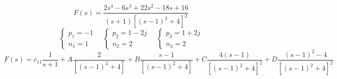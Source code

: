 	\begin{mdframed}[style=Exercise]
		\begin{Exercise}[title={Poli reali semplici, poli complessi multipli}, difficulty=3]
			\[
				F(s) = \frac{2s^4-6s^3+22s^2-18s+16}{(s+1)[(s-1)^2+4]^2}
			\]
			\[
				\begin{cases}
					p_1 = -1\\
					n_1 = 1 
				\end{cases}\quad
				\begin{cases}
					p_2 = 1 - 2j\\
					n_2 = 2
				\end{cases}\quad
				\begin{cases}
					p_3 = 1 + 2j\\
					n_3 = 2
				\end{cases}
			\]
			\[
				F(s) = c_{11} \frac{1}{s+1} + A \frac{2}{[(s-1)^2+4]} + B \frac{s-1}{[(s-1)^2+4]} + C \frac{4(s-1)}{[(s-1)^2+4]^2} + D \frac{(s-1)^2-4}{[(s-1)^2+4]^2}
			\]
			

\end{Exercise}
\end{mdframed}
